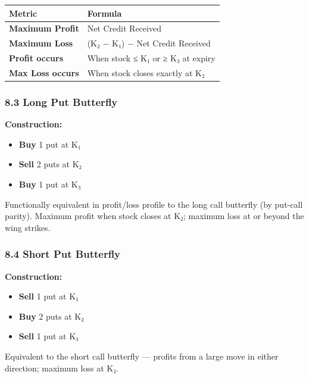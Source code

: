 \documentclass[12pt,openany]{book}
\begin{document}
\begin{center}
\scriptsize
\setlength{\tabcolsep}{3pt}
\begin{tabular}{|L{6.00cm}|L{6.00cm}|}
\hline
Metric & Formula \\
\hline
\textbf{Maximum Profit} & Net Credit Received \\
\hline
\textbf{Maximum Loss} & (K₂ − K₁) − Net Credit Received \\
\hline
\textbf{Profit occurs} & When stock ≤ K₁ or ≥ K₃ at expiry \\
\hline
\textbf{Max Loss occurs} & When stock closes exactly at K₂ \\
\hline
\end{tabular}
\end{center}



\subsubsection{8.3 Long Put Butterfly}

\textbf{Construction:}
\begin{itemize}[leftmargin=*]
    \item \textbf{Buy} 1 put at K₁
    \item \textbf{Sell} 2 puts at K₂
    \item \textbf{Buy} 1 put at K₃
\end{itemize}

Functionally equivalent in profit/loss profile to the long call butterfly (by put-call parity). Maximum profit when stock closes at K₂; maximum loss at or beyond the wing strikes.



\subsubsection{8.4 Short Put Butterfly}

\textbf{Construction:}
\begin{itemize}[leftmargin=*]
    \item \textbf{Sell} 1 put at K₁
    \item \textbf{Buy} 2 puts at K₂
    \item \textbf{Sell} 1 put at K₃
\end{itemize}

Equivalent to the short call butterfly — profits from a large move in either direction; maximum loss at K₂.
\end{document}
